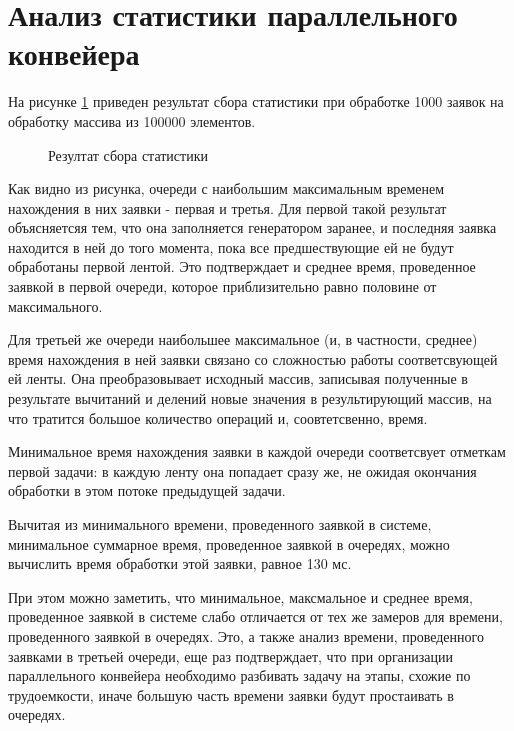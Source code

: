 \section{Анализ статистики параллельного конвейера}

На рисунке \ref{fig:stats} приведен результат сбора статистики при обработке 1000 заявок на обработку массива из 100000 элементов.

\newpage
\begin{figure}[h!]
	
	
	\caption{Резултат сбора статистики}
	
	\label{fig:stats}
	
\end{figure}


Как видно из рисунка, очереди с наибольшим максимальным временем нахождения в них заявки - первая и третья.
 Для первой такой результат объясняетсяя тем, что она заполняется генератором заранее, и последняя заявка находится в ней до того момента, пока все предшествующие ей не будут обработаны первой лентой. Это подтверждает и среднее время, проведенное заявкой в первой очереди, которое приблизительно равно половине от максимального.
 
 Для третьей же очереди наибольшее максимальное (и, в частности, среднее) время нахождения в ней заявки связано со сложностью работы соответсвующей ей ленты. Она преобразовывает исходный массив, записывая полученные в результате вычитаний и делений новые значения в результирующий массив, на что тратится большое количество операций и, соовтетсвенно,  время.


Минимальное время нахождения заявки в каждой очереди соответсвует отметкам первой задачи: в каждую ленту она попадает сразу же, не ожидая окончания обработки в этом потоке предыдущей задачи. 

Вычитая из минимального времени, проведенного заявкой в системе, минимальное суммарное время, проведенное заявкой в очередях, можно вычислить время обработки этой заявки, равное 130 мс.

При этом можно заметить, что минимальное, максмальное и среднее время, проведенное заявкой в системе слабо  отличается от тех же замеров для времени, проведенного заявкой в очередях. Это, а также анализ времени, проведенного заявками в третьей очереди,  еще раз подтверждает, что при организации параллельного конвейера необходимо разбивать задачу на этапы, схожие по трудоемкости, иначе большую часть времени заявки будут простаивать в очередях.


